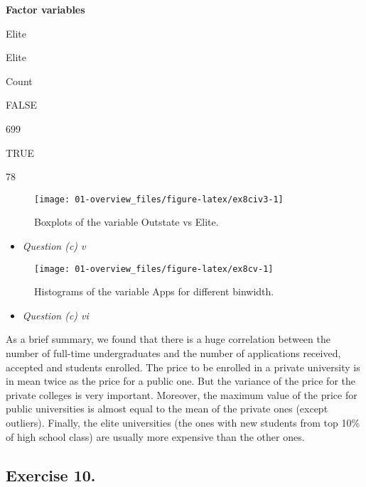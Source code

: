 \documentclass[]{book}
\providecommand{\tightlist}{%
  \setlength{\itemsep}{0pt}\setlength{\parskip}{0pt}}
\begin{document}
\textbf{Factor variables}

Elite

Elite

Count

FALSE

699

TRUE

78

\begin{figure}

{\centering \texttt{[image: 01-overview\_files/figure-latex/ex8civ3-1]} 

}

\caption{Boxplots of the variable Outstate vs Elite.}\label{fig:ex8civ3}
\end{figure}

\begin{itemize}
\tightlist
\item
  \emph{Question (c) v}
\end{itemize}

\begin{figure}

{\centering \texttt{[image: 01-overview\_files/figure-latex/ex8cv-1]} 

}

\caption{Histograms of the variable Apps for different binwidth.}\label{fig:ex8cv}
\end{figure}

\begin{itemize}
\tightlist
\item
  \emph{Question (c) vi}
\end{itemize}

As a brief summary, we found that there is a huge correlation between the number of full-time undergraduates and the number of applications received, accepted and students enrolled. The price to be enrolled in a private university is in mean twice as the price for a public one. But the variance of the price for the private colleges is very important. Moreover, the maximum value of the price for public universities is almost equal to the mean of the private ones (except outliers). Finally, the elite universities (the ones with new students from top 10\% of high school class) are usually more expensive than the other ones.

\hypertarget{exercise-10.}{%
\subsection{Exercise 10.}\label{exercise-10.}}
\end{document}
